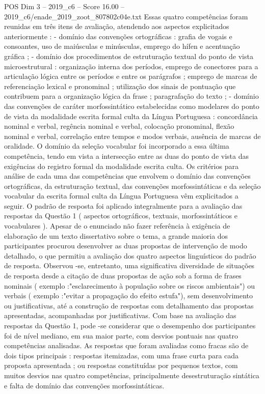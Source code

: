 \begin{textsample}{POS Dim 3 – 2019\_c6 – Score 16.00 – 2019\_c6/enade\_2019\_zoot\_807802c04e.txt}
Essas quatro competências foram reunidas em três itens de avaliação, atendendo aos aspectos explicitados anteriormente : - domínio das convenções ortográficas : grafia de vogais e consoantes, uso de maiúsculas e minúsculas, emprego do hífen e acentuação gráfica ; - domínio dos procedimentos de estruturação textual do ponto de vista microestrutural : organização interna dos períodos, emprego de conectores para a articulação lógica entre os períodos e entre os parágrafos ; emprego de marcas de referenciação lexical e pronominal ; utilização dos sinais de pontuação que contribuem para a organização lógica da frase ; paragrafação do texto ; - domínio das convenções de caráter morfossintático estabelecidas como modelares do ponto de vista da modalidade escrita formal culta da Língua Portuguesa : concordância nominal e verbal, regência nominal e verbal, colocação pronominal, flexão nominal e verbal, correlação entre tempos e modos verbais, ausência de marcas de oralidade.
O domínio da seleção vocabular foi incorporado a essa última competência, tendo em vista a intersecção entre as duas do ponto de vista das exigências do registro formal da modalidade escrita culta.
Os critérios para análise de cada uma das competências que envolvem o domínio das convenções ortográficas, da estruturação textual, das convenções morfossintáticas e da seleção vocabular da escrita formal culta da Língua Portuguesa vêm explicitados a seguir.
O padrão de resposta foi aplicado integralmente para a avaliação das respostas da Questão 1 ( aspectos ortográficos, textuais, morfossintáticos e vocabulares ).
Apesar de o enunciado não fazer referência à exigência de elaboração de um texto dissertativo sobre o tema, a grande maioria dos participantes procurou desenvolver as duas propostas de intervenção de modo detalhado, o que permitiu a avaliação dos quatro aspectos linguísticos do padrão de resposta.
Observou -se, entretanto, uma significativa diversidade de situações de resposta desde a citação de duas propostas de ação sob a forma de frases nominais ( exemplo :"esclarecimento à população sobre os riscos ambientais") ou verbais ( exemplo :"evitar a propagação do efeito estufa"), sem desenvolvimento ou justificativas, até a construção de respostas com detalhamento das propostas apresentadas, acompanhadas por justificativas.
Com base na avaliação das respostas da Questão 1, pode -se considerar que o desempenho dos participantes foi de nível mediano, em sua maior parte, com desvios pontuais nas quatro competências analisadas.
As respostas que foram avaliadas como fracas são de dois tipos principais : respostas itemizadas, com uma frase curta para cada proposta apresentada ; ou respostas constituídas por pequenos textos, com muitos desvios nas quatro competências, principalmente desestruturação sintática e falta de domínio das convenções morfossintáticas.

\end{textsample}
